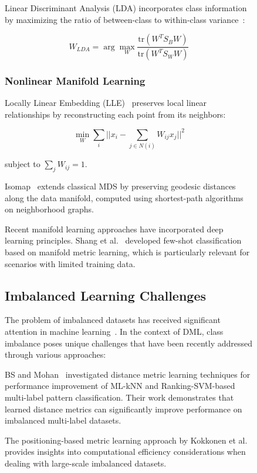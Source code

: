 \documentclass[review]{elsarticle}
\begin{document}
\begin{figure}[htbp]
Linear Discriminant Analysis (LDA) incorporates class information by maximizing the ratio of between-class to within-class variance~\cite{belhumeur1997eigenfaces}:

\begin{equation}
W_{LDA} = \arg\max_W \frac{\text{tr}(W^T S_B W)}{\text{tr}(W^T S_W W)}
\end{equation}

\subsubsection{Nonlinear Manifold Learning}

Locally Linear Embedding (LLE)~\cite{roweis2000nonlinear} preserves local linear relationships by reconstructing each point from its neighbors:

\begin{equation}
\min_W \sum_i ||x_i - \sum_{j \in N(i)} W_{ij} x_j||^2
\end{equation}

subject to $\sum_j W_{ij} = 1$.

Isomap~\cite{tenenbaum2000global} extends classical MDS by preserving geodesic distances along the data manifold, computed using shortest-path algorithms on neighborhood graphs.

Recent manifold learning approaches have incorporated deep learning principles. Shang et al.~\cite{shang2024few} developed few-shot classification based on manifold metric learning, which is particularly relevant for scenarios with limited training data.

\subsection{Imbalanced Learning Challenges}

The problem of imbalanced datasets has received significant attention in machine learning~\cite{he2009learning}. In the context of DML, class imbalance poses unique challenges that have been recently addressed through various approaches:

BS and Mohan~\cite{bs2025distance} investigated distance metric learning techniques for performance improvement of ML-kNN and Ranking-SVM-based multi-label pattern classification. Their work demonstrates that learned distance metrics can significantly improve performance on imbalanced multi-label datasets.

The positioning-based metric learning approach by Kokkonen et al.~\cite{kokkonen2025metric} provides insights into computational efficiency considerations when dealing with large-scale imbalanced datasets.


\end{figure}
\end{document}
